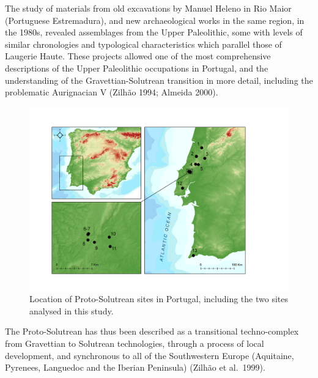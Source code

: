 \documentclass[12pt,twoside]{reedthesis}
\begin{document}
The study of materials from old excavations by Manuel Heleno in Rio Maior (Portuguese Estremadura), and new archaeological works in the same region, in the 1980s, revealed assemblages from the Upper Paleolithic, some with levels of similar chronologies and typological characteristics which parallel those of Laugerie Haute. These projects allowed one of the most comprehensive descriptions of the Upper Paleolithic occupations in Portugal, and the understanding of the Gravettian-Solutrean transition in more detail, including the problematic Aurignacian V (Zilhão 1994; Almeida 2000).
\begin{figure}

{\centering \includegraphics[width=0.5\linewidth]{figure/map_proto_solutrean} 

}

\caption{Location of Proto-Solutrean sites in Portugal, including the two sites analysed in this study.}\label{fig:protomap}
\end{figure}
The Proto-Solutrean has thus been described as a transitional techno-complex from Gravettian to Solutrean technologies, through a process of local development, and synchronous to all of the Southwestern Europe (Aquitaine, Pyrenees, Languedoc and the Iberian Peninsula) (Zilhão et al.~1999).
\end{document}
